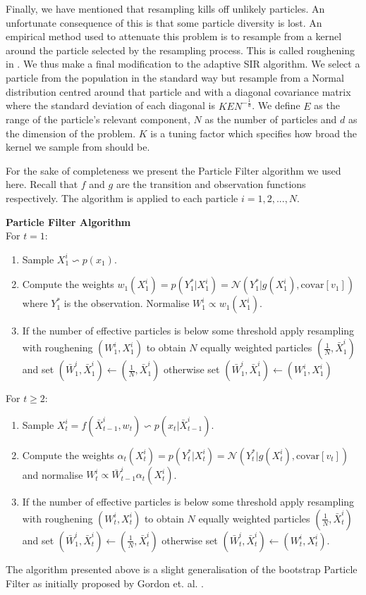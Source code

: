 \documentclass[../masters.tex]{subfiles}
\begin{document}
Finally, we have mentioned that resampling kills off unlikely particles. An unfortunate consequence of this is that some particle diversity is lost. An empirical method used to attenuate this problem is to resample from a kernel around the particle selected by the resampling process. This is called roughening in \cite{gordon}. We thus make a final modification to the adaptive SIR algorithm. We select a particle from the population in the standard way but resample from a Normal distribution centred around that particle and with a diagonal covariance matrix where the standard deviation of each diagonal is $KEN^{-\frac{1}{d}}$. We define $E$ as the range of the particle's relevant component, $N$ as the number of particles and $d$ as the dimension of the problem. $K$ is a tuning factor which specifies how broad the kernel we sample from should be. 

For the sake of completeness we present the Particle Filter algorithm we used here. Recall that $f$ and $g$ are the transition and observation functions respectively. The algorithm is applied to each particle $i=1,2,...,N$.

\textbf{Particle Filter Algorithm}\\
For $t=1$:
\begin{enumerate}
\item
Sample $X^i_1 \backsim p(x_1)$.
\item
Compute the weights $w_1(X_1^i) = p(Y^*_1|X_1^i) = \mathcal{N}(Y^*_1|g(X^i_1), \text{covar}[v_1])$ where $Y^*_1$ is the observation. Normalise $W^i_1 \propto w_1(X^i_1)$.
\item
If the number of effective particles is below some threshold apply resampling with roughening $(W^i_1, X^i_1)$ to obtain $N$ equally weighted particles $(\frac{1}{N}, \bar{X}^i_1)$ and set $(\bar{W}^i_1, \bar{X}^i_1) \leftarrow (\frac{1}{N}, \bar{X}^i_1)$ otherwise set $(\bar{W}^i_1, \bar{X}^i_1) \leftarrow ({W}^i_1, {X}^i_1)$
\end{enumerate}
For $t \geq 2$:
\begin{enumerate}
\item
Sample $X^i_t = f(\bar{X}^i_{t-1}, w_t) \backsim p(x_t|\bar{X}^i_{t-1})$.
\item
Compute the weights $\alpha_t(X^i_{t}) = p(Y^*_t|X_t^i) = \mathcal{N}(Y^*_t|g(X^i_t), \text{covar}[v_t])$ and normalise $W^i_t \propto \bar{W}^i_{t-1}\alpha_t(X^i_{t})$.
\item
If the number of effective particles is below some threshold apply resampling with roughening $(W^i_t, X^i_{t})$ to obtain $N$ equally weighted particles $(\frac{1}{N}, \bar{X}^i_{t})$ and set $(\bar{W}^i_1, \bar{X}^i_t) \leftarrow (\frac{1}{N}, \bar{X}^i_t)$ otherwise set $(\bar{W}^i_t, \bar{X}^i_t) \leftarrow ({W}^i_t, {X}^i_t)$.
\end{enumerate}
The algorithm presented above is a slight generalisation of the bootstrap Particle Filter as initially proposed by Gordon et. al. \cite{gordon}.
\end{document}

